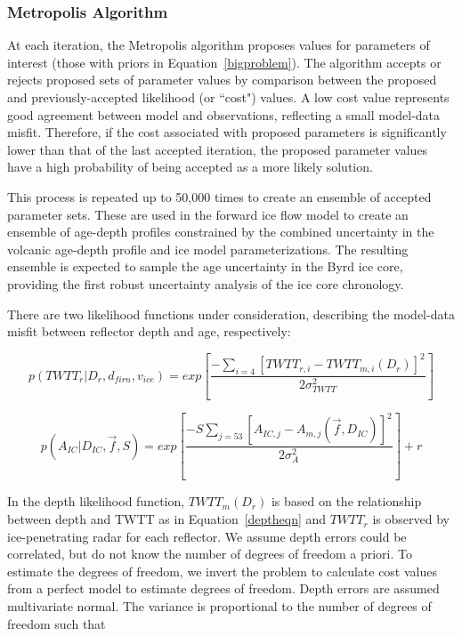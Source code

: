 \subsubsection{Metropolis Algorithm}\label{metrop}
At each iteration, the Metropolis algorithm proposes values for parameters of interest (those with priors in Equation~\ref{bigproblem}). The algorithm accepts or rejects proposed sets of parameter values by comparison between the proposed and previously-accepted likelihood (or ``cost") values. A low cost value represents good agreement between model and observations, reflecting a small model-data misfit. Therefore, if the cost associated with proposed parameters is significantly lower than that of the last accepted iteration, the proposed parameter values have a high probability of being accepted as a more likely solution. 

This process is repeated up to 50,000 times to create an ensemble of accepted parameter sets. These are used in the forward ice flow model to create an ensemble of age-depth profiles constrained by the combined uncertainty in the volcanic age-depth profile and ice model parameterizations. The resulting ensemble is expected to sample the age uncertainty in the Byrd ice core, providing the first robust uncertainty analysis of the ice core chronology. 

There are two likelihood functions under consideration, describing the model-data misfit between reflector depth and age, respectively:

\begin{equation}\label{eqn:loglikedepth}
p(TWTT_r | D_r,d_{firn},v_{ice} )= exp[\frac{-\sum_{i=4}[TWTT_{r,i} - TWTT_{m,i}(D_r)]^2}{2\sigma_{TWTT}^2}]
\end{equation}

\begin{equation}\label{loglikeage}
p(A_{IC} | D_{IC},\vec{f},S)= exp[\frac{-S\sum_{j = 53}[A_{IC,j} - A_{m,j}(\vec{f},D_{IC})]^2}{2\sigma_A^2}] + r
\end{equation}

In the depth likelihood function, $TWTT_m(D_r)$ is based on the relationship between depth and TWTT as in Equation~\ref{deptheqn} and $TWTT_r$ is observed by ice-penetrating radar for each reflector. We assume depth errors could be correlated, but do not know the number of degrees of freedom a priori. To estimate the degrees of freedom, we invert the problem to calculate cost values from a perfect model to estimate degrees of freedom. Depth errors are assumed multivariate normal. The variance is proportional to the number of degrees of freedom such that

